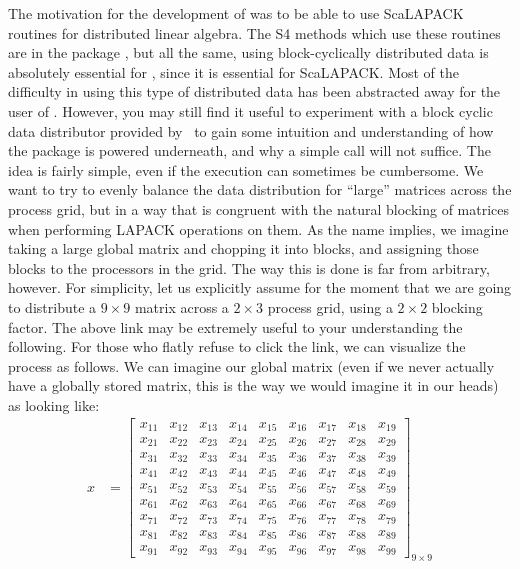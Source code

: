 The motivation for the development of  was to be able to use ScaLAPACK routines for distributed linear algebra.  The S4 methods which use these routines are in the package , but all the same, using block-cyclically distributed data is absolutely essential for , since it is essential for ScaLAPACK.  
\np
Most of the difficulty in using this type of distributed data has been abstracted away for the user of .  However, you may still find it useful to experiment with a block cyclic data distributor provided by~\citep{web:datadist} to gain some intuition and understanding of how the package is powered underneath, and why a simple  call will not suffice.
\np
The idea is fairly simple, even if the execution can sometimes be cumbersome.  We want to try to evenly balance the data distribution for ``large'' matrices across the process grid, but in a way that is congruent with the natural blocking of matrices when performing LAPACK operations on them.  As the name implies, we imagine taking a large global matrix and chopping it into blocks, and assigning those blocks to the processors in the grid.  The way this is done is far from arbitrary, however.  
\np
For simplicity, let us explicitly assume for the moment that we are going to distribute a $9\times 9$ matrix across a $2\times 3$ process grid, using a $2\times 2$ blocking factor.  The above link may be extremely useful to your understanding the following.  For those who flatly refuse to click the link, we can visualize the process as follows.  We can imagine our global matrix (even if we never actually have a globally stored matrix, this is the way we would imagine it in our heads) as looking like:
\begin{align*}
x &= \left[
      \begin{array}{lllllllll}
      x_{11} & x_{12} & x_{13} & x_{14} & x_{15} & x_{16} & x_{17} & x	_{18} & x_{19}\\
      x_{21} & x_{22} & x_{23} & x_{24} & x_{25} & x_{26} & x_{27} & x	_{28} & x_{29}\\
      x_{31} & x_{32} & x_{33} & x_{34} & x_{35} & x_{36} & x_{37} & x	_{38} & x_{39}\\
      x_{41} & x_{42} & x_{43} & x_{44} & x_{45} & x_{46} & x_{47} & x	_{48} & x_{49}\\
      x_{51} & x_{52} & x_{53} & x_{54} & x_{55} & x_{56} & x_{57} & x	_{58} & x_{59}\\
      x_{61} & x_{62} & x_{63} & x_{64} & x_{65} & x_{66} & x_{67} & x	_{68} & x_{69}\\
      x_{71} & x_{72} & x_{73} & x_{74} & x_{75} & x_{76} & x_{77} & x	_{78} & x_{79}\\
      x_{81} & x_{82} & x_{83} & x_{84} & x_{85} & x_{86} & x_{87} & x	_{88} & x_{89}\\
      x_{91} & x_{92} & x_{93} & x_{94} & x_{95} & x_{96} & x_{97} & x	_{98} & x_{99}
      \end{array}
\right]_{9\times 9}
\end{align*}

